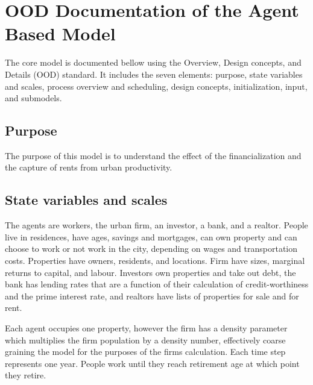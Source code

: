 
\chapter{OOD Documentation of the Agent Based Model} \label{appendix-odd}



The core model is documented bellow using the Overview, Design concepts, and Details (OOD) standard. It includes the seven elements: purpose, state variables and scales, process overview and scheduling, design concepts, initialization, input, and submodels.

\section{Purpose}

The purpose of this model is to understand the effect of the financialization and the capture of rents from urban productivity. %


\section{State variables and scales}

The agents are workers,  %
the urban firm, an investor, a bank, and a realtor. People live in residences, have ages, savings and mortgages, can own property and can choose to work or not work in the city, depending on wages and transportation costs. Properties have owners, residents, and locations. Firm have sizes, marginal returns to capital, and labour.  
Investors own properties and take out debt, the bank has lending rates that are a function of their calculation of credit-worthiness and the prime interest rate, and realtors have lists of properties for sale and for rent. 

Each agent occupies one property, however the firm has a density parameter which multiplies the firm population by a density number, effectively coarse graining the model for the purposes of the firms calculation. 
Each time step represents one year. People work until they reach retirement age at which point they retire. 

